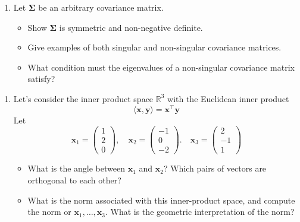 \documentclass[]{book}
\providecommand{\tightlist}{%
  \setlength{\itemsep}{0pt}\setlength{\parskip}{0pt}}
\theoremstyle{definition}
\theoremstyle{definition}
\theoremstyle{definition}
\theoremstyle{remark}
\begin{document}
\begin{enumerate}
\def\labelenumi{\arabic{enumi}.}
\setcounter{enumi}{2}
\tightlist
\item
  Let \(\boldsymbol \Sigma\) be an arbitrary covariance matrix.

  \begin{itemize}
  \tightlist
  \item
    Show \(\boldsymbol \Sigma\) is symmetric and
    non-negative definite.
  \item
    Give examples of both singular and non-singular covariance matrices.\\
  \item
    What condition must the eigenvalues of a non-singular covariance matrix satisfy?
  \end{itemize}
\end{enumerate}

\begin{enumerate}
\def\labelenumi{\arabic{enumi}.}
\setcounter{enumi}{3}
\item
  Let's consider the inner product space \(\mathbb{R}^3\) with the Euclidean inner product
  \[\langle \boldsymbol x, \boldsymbol y\rangle = \boldsymbol x^\top \boldsymbol y\]
  Let
  \[\boldsymbol x_1 = \left(\begin{array}{c}1\\2\\0\end{array}\right), \quad \boldsymbol x_2 = \left(\begin{array}{c}-1\\0\\-2\end{array}\right). \quad \boldsymbol x_3 = \left(\begin{array}{c}2\\-1\\1\end{array}\right)
    \]

  \begin{itemize}
  \tightlist
  \item
    What is the angle between \(\boldsymbol x_1\) and \(\boldsymbol x_2\)? Which pairs of vectors are orthogonal to each other?
  \item
    What is the norm associated with this inner-product space, and compute the norm or \(\boldsymbol x_1, \ldots, \boldsymbol x_3\). What is the geometric interpretation of the norm?
  \end{itemize}
\end{enumerate}
\end{document}
